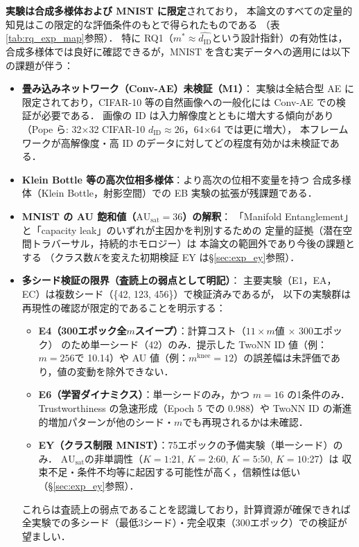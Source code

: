 \documentclass[12pt,a4paper]{jsarticle}
\newcommand{\dID}{d_{\mathrm{ID}}}
\newcommand{\dzopt}{m^*}                    %
\newcommand{\AUsat}{\mathrm{AU}_{\mathrm{sat}}}
\newcommand{\mknee}{m^{\mathrm{knee}}}      %
\begin{document}
\textbf{実験は合成多様体および MNIST に限定}されており，
本論文のすべての定量的知見はこの限定的な評価条件のもとで得られたものである
（表\ref{tab:rq_exp_map}参照）．
特に RQ1（$\dzopt \approx \hat{\dID}$という設計指針）の有効性は，
合成多様体では良好に確認できるが，MNIST を含む実データへの適用には以下の課題が伴う：

\begin{itemize}
  \item \textbf{畳み込みネットワーク（Conv-AE）未検証（M1）}：
        実験は全結合型 AE に限定されており，CIFAR-10 等の自然画像への一般化には
        Conv-AE での検証が必要である．
        画像の ID は入力解像度とともに増大する傾向があり\cite{pope2021intrinsic}
        （Pope ら: 32×32 CIFAR-10 $\dID \approx 26$，64×64 では更に増大），
        本フレームワークが高解像度・高 ID のデータに対してどの程度有効かは未検証である．
  \item \textbf{Klein Bottle 等の高次位相多様体}：より高次の位相不変量を持つ
        合成多様体（Klein Bottle，射影空間）での EB 実験の拡張が残課題である．
  \item \textbf{MNIST の AU 飽和値（$\AUsat = 36$）の解釈}：
        「Manifold Entanglement」と「capacity leak」のいずれが主因かを判別するための
        定量的証拠（潜在空間トラバーサル，持続的ホモロジー\cite{carlsson2009topology}）は
        本論文の範囲外であり今後の課題とする
        （クラス数$K$を変えた初期検証 EY は§\ref{sec:exp_ey}参照）．
  \item \textbf{多シード検証の限界（査読上の弱点として明記）}：
        主要実験（E1，EA，EC）は複数シード（\{42, 123, 456\}）で検証済みであるが，
        以下の実験群は再現性の確認が限定的であることを明示する：
        \begin{itemize}
          \item \textbf{E4（300エポック全$m$スイープ）}：計算コスト（$11 \times m$値 $\times$ 300エポック）
                のため単一シード（42）のみ．提示した TwoNN ID 値（例：$m=256$で 10.14）や
                AU 値（例：$\mknee = 12$）の誤差幅は未評価であり，値の変動を除外できない．
          \item \textbf{E6（学習ダイナミクス）}：単一シードのみ，かつ $m = 16$ の1条件のみ．
                Trustworthiness の急速形成（Epoch 5 での 0.988）や
                TwoNN ID の漸進的増加パターンが他のシード・$m$でも再現されるかは未確認．
          \item \textbf{EY（クラス制限 MNIST）}：75エポックの予備実験（単一シード）のみ．
                $\AUsat$の非単調性（$K=1$:21, $K=2$:60, $K=5$:50, $K=10$:27）は
                収束不足・条件不均等に起因する可能性が高く，信頼性は低い（§\ref{sec:exp_ey}参照）．
        \end{itemize}
        これらは査読上の弱点であることを認識しており，計算資源が確保できれば
        全実験での多シード（最低3シード）・完全収束（300エポック）での検証が望ましい．
\end{itemize}
\end{document}
